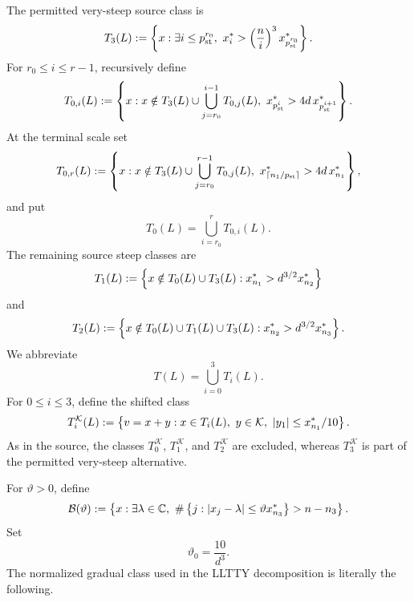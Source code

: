 The permitted very-steep source class is
\begin{equation}\label{eq:T3}
  T_3(L):=
  \set{x:\exists i\le p_{\mathrm{st}}^{r_0},\ 
  x_i^*>\left(\frac ni\right)^3x_{p_{\mathrm{st}}^{r_0}}^*}.
\end{equation}
For $r_0\le i\le r-1$, recursively define
\begin{equation}\label{eq:T0i}
  T_{0,i}(L):=
  \set{x:x\notin T_3(L)\cup\bigcup_{j=r_0}^{i-1}T_{0,j}(L),\ 
  x_{p_{\mathrm{st}}^i}^*>4d\,x_{p_{\mathrm{st}}^{i+1}}^*}.
\end{equation}
At the terminal scale set
\begin{equation}\label{eq:T0r}
  T_{0,r}(L):=
  \set{x:x\notin T_3(L)\cup\bigcup_{j=r_0}^{r-1}T_{0,j}(L),\ 
  x_{\ceil{n_1/p_{\mathrm{st}}}}^*>4d\,x_{n_1}^*},
\end{equation}
and put
\begin{equation}\label{eq:T0}
  T_0(L)=\bigcup_{i=r_0}^rT_{0,i}(L).
\end{equation}
The remaining source steep classes are
\begin{equation}\label{eq:T1}
  T_1(L):=\left\{x\notin T_0(L)\cup T_3(L):x_{n_1}^*>d^{3/2}x_{n_2}^*\right\}
\end{equation}
and
\begin{equation}\label{eq:T2}
  T_2(L):=\left\{x\notin T_0(L)\cup T_1(L)\cup T_3(L):x_{n_2}^*>d^{3/2}x_{n_3}^*\right\}.
\end{equation}
We abbreviate
\begin{equation}\label{eq:T-union}
  T(L)=\bigcup_{i=0}^3T_i(L).
\end{equation}
For $0\le i\le3$, define the shifted class
\begin{equation}\label{eq:shifted-Ti}
  T_i^{\mathcal K}(L):=
  \left\{v=x+y:x\in T_i(L),\ y\in\mathcal K,\ |y_1|\le x_{n_1}^*/10\right\}.
\end{equation}
As in the source, the classes $T_0^{\mathcal K}$, $T_1^{\mathcal K}$, and $T_2^{\mathcal K}$ are excluded, whereas $T_3^{\mathcal K}$ is part of the permitted very-steep alternative.

For $\vartheta>0$, define
\begin{equation}\label{eq:B-vartheta}
  \mathcal B(\vartheta):=
  \set{x:\exists\lambda\in\C,\ 
  \#\set{j:|x_j-\lambda|\le\vartheta x_{n_3}^*}>n-n_3}.
\end{equation}
Set
\begin{equation}\label{eq:vartheta0}
  \vartheta_0=\frac{10}{d^3}.
\end{equation}
The normalized gradual class used in the LLTTY decomposition is literally the following.

